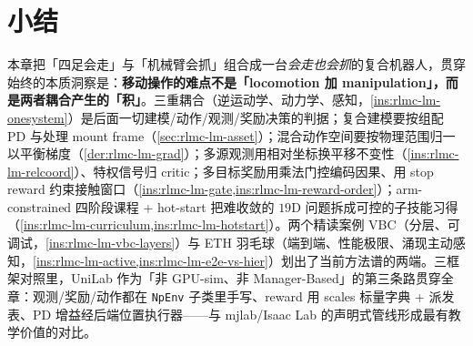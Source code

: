 \section{小结}
\label{sec:rlmc-lm-summary}

本章把「四足会走」与「机械臂会抓」组合成一台\emph{会走也会抓}的复合机器人，贯穿始终的本质洞察是：\textbf{移动操作的难点不是「locomotion 加 manipulation」，而是两者耦合产生的「积」}。三重耦合（逆运动学、动力学、感知，\cref{ins:rlmc-lm-onesystem}）是后面一切建模/动作/观测/奖励决策的判据；复合建模要按组配 PD 与处理 mount frame（\cref{sec:rlmc-lm-asset}）；混合动作空间要按物理范围归一以平衡梯度（\cref{der:rlmc-lm-grad}）；多源观测用相对坐标换平移不变性（\cref{ins:rlmc-lm-relcoord}）、特权信号归 critic；多目标奖励用乘法门控编码因果、用 stop reward 约束接触窗口（\cref{ins:rlmc-lm-gate,ins:rlmc-lm-reward-order}）；arm-constrained 四阶段课程 + hot-start 把难收敛的 $19$D 问题拆成可控的子技能习得（\cref{ins:rlmc-lm-curriculum,ins:rlmc-lm-hotstart}）。两个精读案例 VBC（分层、可调试，\cref{ins:rlmc-lm-vbc-layers}）与 ETH 羽毛球（端到端、性能极限、涌现主动感知，\cref{ins:rlmc-lm-active,ins:rlmc-lm-e2e-vs-hier}）划出了当前方法谱的两端。三框架对照里，UniLab 作为「非 GPU-sim、非 Manager-Based」的第三条路贯穿全章：观测/奖励/动作都在 \verb|NpEnv| 子类里手写、reward 用 scales 标量字典 + 派发表、PD 增益经后端位置执行器——与 mjlab/Isaac Lab 的声明式管线形成最有教学价值的对比。

